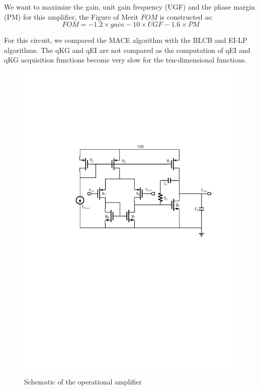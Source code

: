 We want to maximize the gain, unit gain frequency (UGF) and the phase margin (PM) for this amplifier, the Figure of Merit $FOM$ is constructed as:
$$
\mathit{FOM} = -1.2 \times \mathit{gain} - 10 \times \mathit{UGF} - 1.6 \times \mathit{PM}
$$

For this circuit, we compared the MACE algorithm with the BLCB and EI-LP
algorithms. The qKG and qEI are not compared as the computation of qEI and qKG
acquisition functions become very slow for the ten-dimensional functions.


\begin{figure}[h]
    \begin{center}
        \centerline{\includegraphics[width=\columnwidth]{./img/sopam.pdf}}
        \caption{Schematic of the operational amplifier}
        \label{fig:schDAC2014}
    \end{center}
\end{figure}


